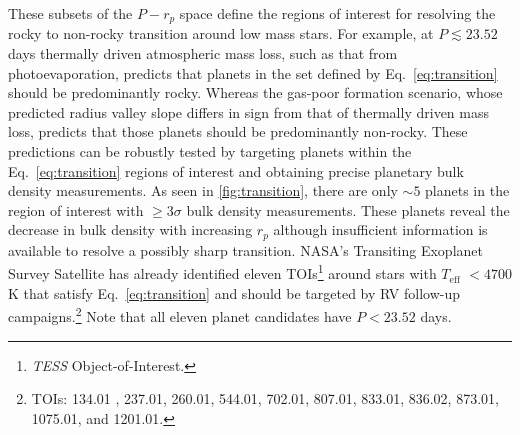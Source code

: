\documentclass[twocolumn]{emulateapj}
\newcommand{\tess}[1]{\emph{TESS}#1}
\newcommand{\teff}[1]{$T_{\text{eff}}$#1}
\begin{document}
\noindent These subsets of the $P-r_p$ space define the regions of interest for resolving the
  rocky to non-rocky transition around low mass stars. For example, at $P\lesssim 23.52$ days thermally driven
  atmospheric mass loss, such as that from photoevaporation, predicts that planets in the set defined by
  Eq.~\ref{eq:transition} should be predominantly rocky. Whereas the gas-poor formation scenario, whose predicted
  radius valley slope differs in sign from that of thermally driven mass loss, predicts that those planets should be
  predominantly non-rocky. These predictions can be robustly tested by targeting planets within the
  Eq.~\ref{eq:transition} regions of interest and obtaining precise planetary bulk density measurements.
  As seen in \autoref{fig:transition}, there are only $\sim 5$ planets in the region of interest with $\geq 3\sigma$ bulk
  density measurements. These planets reveal the decrease in bulk density with increasing $r_p$ although insufficient
  information is available to resolve a possibly sharp transition.
  NASA's Transiting Exoplanet Survey Satellite \citep[\tess{;}][]{ricker15} has already identified eleven
  TOIs\footnote{\tess{} Object-of-Interest.}
  around stars with \teff{} $<4700$ K that satisfy Eq.~\ref{eq:transition} and should be targeted by RV
  follow-up campaigns.\footnote{TOIs: 134.01 \citep{astudillodefru19}, 237.01, 260.01, 544.01, 702.01, 807.01, 833.01,
    836.02, 873.01, 1075.01, and 1201.01.} Note that all eleven planet candidates have $P<23.52$ days.
\end{document}
